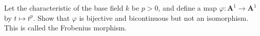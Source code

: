 Let the characteristic of the base field $k$ be $p > 0$, and define a map $\varphi: \mathbf{A}^1 \to \mathbf{A}^1$ by $t \mapsto t^p$. Show that $\varphi$ is bijective and bicontinuous but not an isomorphism. This is called the Frobenius morphism.
